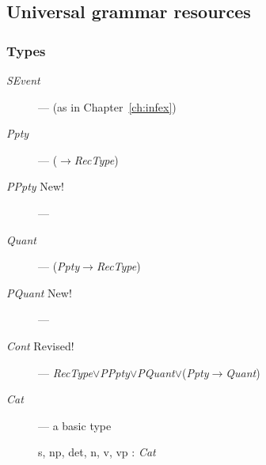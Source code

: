 \subsection{Universal grammar resources} 

\subsubsection{Types} 

\begin{description}
\item[\textnormal{\textit{SEvent}}] ---  (as in
      Chapter~\ref{ch:infex})

      \item[\textnormal{\textit{Ppty}}] ---
        ($\rightarrow$\textit{RecType})
        
      \item[\textnormal{\textit{PPpty}} New!] --- 
        
      \item[\textnormal{\textit{Quant}}] ---
        (\textit{Ppty}$\rightarrow$\textit{RecType})
        
      \item[\textnormal{\textit{PQuant}} New!] --- 

    \item[\textnormal{\textit{Cont}} Revised!] --- \textit{RecType}$\vee$\textit{PPpty}$\vee$\textit{PQuant}$\vee$(\textit{Ppty}$\rightarrow$\textit{Quant})

      
    \item[\textnormal{\textit{Cat}}] --- a basic type

      s, np, det, n, v, vp : \textit{Cat}


\end{description}
